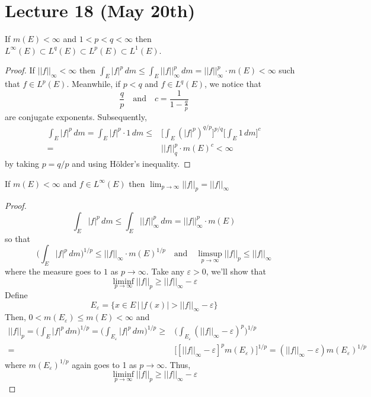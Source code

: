 \section{Lecture 18 (May 20th)}
\begin{thm}
If $m(E)<\infty $ and $1<p<q<\infty $ then $L^{\infty }(E)\subset L^{q}(E)\subset L^{p}(E)\subset L^{1}(E)$. 
\end{thm}
\vspace{2ex}
\begin{proof}
If $||f||_{\infty }<\infty $ then $\int _{E}|f|^{p}\,d m\leq \int _{E}||f||^{p}_{\infty }\,d m=||f||^{p}_{\infty }\cdot m(E)<\infty $ such that $f\in L^{p}(E)$. Meanwhile, if $p<q$ and $f\in L^{q}(E)$, we notice that 
\[\dfrac{q}{p}\quad\mathrm{and}\quad c=\dfrac{1}{1-\frac{q}{p}}\]
are conjugate exponents. Subsequently,
\begin{align*}
\int _{E}|f|^{p}\,d m=\int _{E}|f|^{p}\cdot 1\,d m\leq &\Big[\int _{E}(|f|^{p})^{q/p}\Big]^{p/q}\Big[\int _{E}1\,d m\Big]^{c}\\
=&||f||^{p}_{q}\cdot m(E)^{c}<\infty
\end{align*}
by taking $p=q/p$ and using H\"{o}lder's inequality.
\end{proof}
\vspace{2ex}
\begin{thm}
If $m(E)<\infty $ and $f\in L^{\infty }(E)$ then $\lim _{p\rightarrow \infty }||f||_{p}=||f||_{\infty }$
\end{thm}
\vspace{2ex}
\begin{proof}
\[\int _{E}|f|^{p}\,d m\leq \int _{E}||f||^{p}_{\infty }\,d m=||f||^{p}_{\infty }\cdot m(E)\]
so that 
\[\Big(\int _{E}|f|^{p}\,d m\Big)^{1/p}\leq ||f||_{\infty }\cdot m(E)^{1/p}\quad \mathrm{and}\quad \limsup_{p\rightarrow \infty }||f||_{p}\leq ||f||_{\infty } \]
where the measure goes to $1$ as $p\rightarrow \infty $. Take any $\varepsilon >0$, we'll show that 
\[\liminf_{p\rightarrow \infty }||f||_{p}\geq ||f||_{\infty }-\varepsilon \]
Define
\[E_{\varepsilon }=\{x\in E \,|\, |f(x)|>||f||_{\infty }-\varepsilon \}\]
Then, $0<m(E_{\varepsilon })\leq m(E)<\infty $ and
\begin{align*}
||f||_{p}=\Big(\int _{E}|f|^{p}\,d m\Big)^{1/p}=\Big(\int _{E_{\varepsilon }}|f|^{p}\,d m\Big)^{1/p}\geq& \Big(\int _{E_{\varepsilon }}(||f||_{\infty }-\varepsilon )^{p}\Big)^{1/p}\\
=&\Big[[||f||_{\infty }-\varepsilon ]^{p}m(E_{\varepsilon })\Big]^{1/p}=(||f||_{\infty }-\varepsilon )m(E_{\varepsilon })^{1/p}
\end{align*}
where $m(E_{\varepsilon })^{1/p}$ again goes to 1 as $p\rightarrow \infty $. Thus,
\[\liminf_{p\rightarrow \infty }||f||_{p}\geq ||f||_{\infty }-\varepsilon \]
\end{proof}
